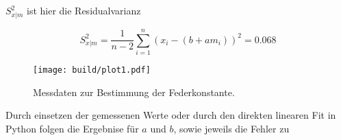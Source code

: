 \begin{flushleft}
$S_{x|m}^2$ ist hier die Residualvarianz
\end{flushleft}
\begin{equation}
S_{x|m}^2 = \frac{1}{n-2} \sum_{i=1}^n (x_i - (b + a m_i))^2 = 0.068
\end{equation}
%
\begin{figure}[t]
  \centering
  \texttt{[image: build/plot1.pdf]}
  \caption{Messdaten zur Bestimmung der Federkonstante.}
  \label{fig:plot1}
\end{figure}
\begin{flushleft}
Durch einsetzen der gemessenen Werte oder durch den direkten linearen Fit in Python folgen die Ergebnise für $a$ und $b$, sowie jeweils die Fehler zu
\end{flushleft}
